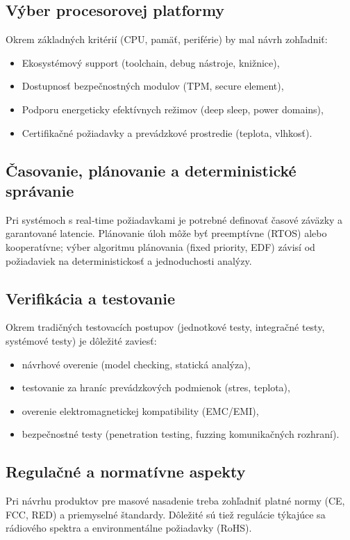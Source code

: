 \subsection{Výber procesorovej platformy}
Okrem základných kritérií (CPU, pamäť, periférie) by mal návrh zohľadniť:
\begin{itemize}
	\item Ekosystémový support (toolchain, debug nástroje, knižnice),
	\item Dostupnosť bezpečnostných modulov (TPM, secure element),
	\item Podporu energeticky efektívnych režimov (deep sleep, power domains),
	\item Certifikačné požiadavky a prevádzkové prostredie (teplota, vlhkosť).
\end{itemize}

\subsection{Časovanie, plánovanie a deterministické správanie}
Pri systémoch s real‑time požiadavkami je potrebné definovať časové záväzky a garantované latencie. Plánovanie úloh môže byť preemptívne (RTOS) alebo kooperatívne; výber algoritmu plánovania (fixed priority, EDF) závisí od požiadaviek na deterministickosť a jednoduchosti analýzy.

\subsection{Verifikácia a testovanie}
Okrem tradičných testovacích postupov (jednotkové testy, integračné testy, systémové testy) je dôležité zaviesť:
\begin{itemize}
	\item návrhové overenie (model checking, statická analýza),
	\item testovanie za hraníc prevádzkových podmienok (stres, teplota),
	\item overenie elektromagnetickej kompatibility (EMC/EMI),
	\item bezpečnostné testy (penetration testing, fuzzing komunikačných rozhraní).
\end{itemize}

\subsection{Regulačné a normatívne aspekty}
Pri návrhu produktov pre masové nasadenie treba zohľadniť platné normy (CE, FCC, RED) a priemyselné štandardy. Dôležité sú tiež regulácie týkajúce sa rádiového spektra a environmentálne požiadavky (RoHS).

